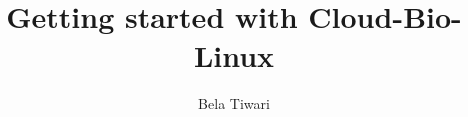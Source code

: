 \documentclass[pdflatex]{article}
\begin{document}
\title{Getting started with Cloud-Bio-Linux}
\author{Bela Tiwari}
\maketitle








\end{document}

